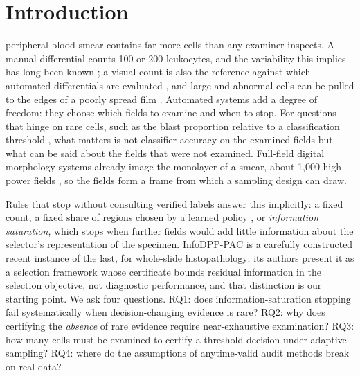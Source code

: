 \documentclass[journal]{IEEEtran}
\begin{document}
\section{Introduction}
 peripheral blood smear contains far more cells than any examiner inspects. A manual differential counts 100 or 200 leukocytes, and the variability this implies has long been known \cite{rumke1978}; a visual count is also the reference against which automated differentials are evaluated \cite{clsi2026h20}, and large and abnormal cells can be pulled to the edges of a poorly spread film \cite{brown2010slidemaker}. Automated systems add a degree of freedom: they choose which fields to examine and when to stop. For questions that hinge on rare cells, such as the blast proportion relative to a classification threshold \cite{khoury2022who,arber2022icc}, what matters is not classifier accuracy on the examined fields but what can be said about the fields that were not examined. Full-field digital morphology systems already image the monolayer of a smear, about 1,000 high-power fields \cite{katz2021scopio}, so the fields form a frame from which a sampling design can draw.

Rules that stop without consulting verified labels answer this implicitly: a fixed count, a fixed share of regions chosen by a learned policy \cite{tarun2025sasha}, or \emph{information saturation}, which stops when further fields would add little information about the selector's representation of the specimen. InfoDPP-PAC \cite{mittal2026infodpp} is a carefully constructed recent instance of the last, for whole-slide histopathology; its authors present it as a selection framework whose certificate bounds residual information in the selection objective, not diagnostic performance, and that distinction is our starting point. We ask four questions. RQ1: does information-saturation stopping fail systematically when decision-changing evidence is rare? RQ2: why does certifying the \emph{absence} of rare evidence require near-exhaustive examination? RQ3: how many cells must be examined to certify a threshold decision under adaptive sampling? RQ4: where do the assumptions of anytime-valid audit methods break on real data?
\end{document}
